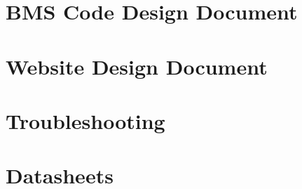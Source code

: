 \documentclass[a4paper,12pt]{report}
\begin{document}
\chapter{BMS Code Design Document}


\chapter{Website Design Document}


\chapter{Troubleshooting}


\chapter{Datasheets}

\end{document}
